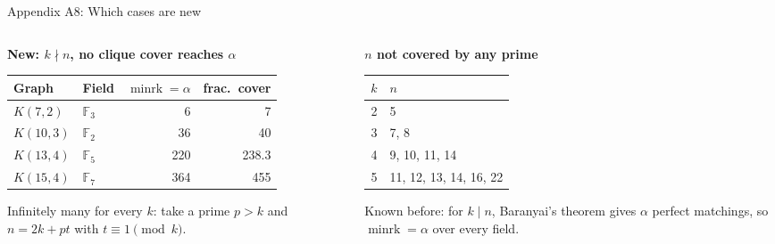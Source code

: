 \documentclass[11pt]{beamer}
\begin{document}
\begin{frame}{Appendix A8: Which cases are new}
  \footnotesize
  \begin{columns}[T]
    \begin{column}{0.52\textwidth}
      \textbf{New: $k \nmid n$, no clique cover reaches $\alpha$}\par\smallskip
      \begin{tabular}{@{}llrr@{}}
        \toprule
        Graph & Field & $\operatorname{minrk} = \alpha$ & frac.\ cover \\
        \midrule
        $K(7,2)$ & $\mathbb{F}_3$ & 6 & 7 \\
        $K(10,3)$ & $\mathbb{F}_2$ & 36 & 40 \\
        $K(13,4)$ & $\mathbb{F}_5$ & 220 & 238.3 \\
        $K(15,4)$ & $\mathbb{F}_7$ & 364 & 455 \\
        \bottomrule
      \end{tabular}\par\medskip
      Infinitely many for every $k$: take a prime $p > k$ and $n = 2k + pt$ with $t \equiv 1 \pmod k$.
    \end{column}
    \begin{column}{0.44\textwidth}
      \textbf{$n$ not covered by any prime}\par\smallskip
      \begin{tabular}{@{}cl@{}}
        \toprule
        $k$ & $n$ \\
        \midrule
        2 & 5 \\
        3 & 7, 8 \\
        4 & 9, 10, 11, 14 \\
        5 & 11, 12, 13, 14, 16, 22 \\
        \bottomrule
      \end{tabular}\par\medskip
      Known before: for $k \mid n$, Baranyai's theorem gives $\alpha$ perfect matchings, so $\operatorname{minrk} = \alpha$
      over every field.
    \end{column}
  \end{columns}
\end{frame}
\end{document}
